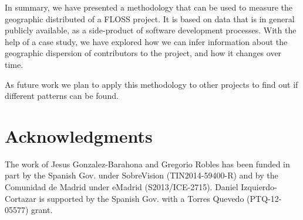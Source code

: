 \documentclass{sig-alternate-05-2015}
\begin{document}
In summary, we have presented a methodology that can be used to measure
the geographic distributed of a FLOSS project. It is based on data that
is in general publicly available, as a side-product of software development processes. With the help of a case study, we have explored how we can infer 
information about the geographic dispersion of contributors to the project,
and how it changes over time.

As future work we plan to apply this methodology to other projects to find
out if different patterns can be found.

\section*{Acknowledgments}

The work of Jesus Gonzalez-Barahona and Gregorio Robles has been funded in part by the Spanish Gov. under SobreVision (TIN2014-59400-R) and by the Comunidad de Madrid under eMadrid (S2013/ICE-2715). Daniel Izquierdo-Cortazar is supported by the Spanish Gov. with a Torres Quevedo (PTQ-12-05577) grant.



%

%
%
\end{document}
